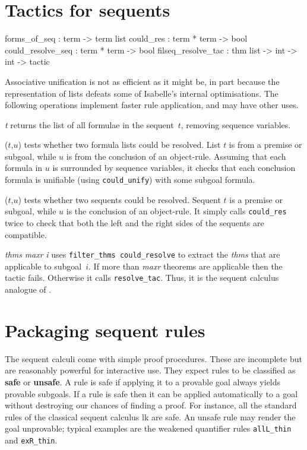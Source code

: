 \section{Tactics for sequents}
\begin{ttbox} 
forms_of_seq       : term -> term list
could_res          : term * term -> bool
could_resolve_seq  : term * term -> bool
filseq_resolve_tac : thm list -> int -> int -> tactic
\end{ttbox}
Associative unification is not as efficient as it might be, in part because
the representation of lists defeats some of Isabelle's internal
optimisations.  The following operations implement faster rule application,
and may have other uses.
\begin{ttdescription}
\item[\ttindexbold{forms_of_seq} {\it t}] 
returns the list of all formulae in the sequent~$t$, removing sequence
variables.

\item[\ttindexbold{could_res} ($t$,$u$)] 
tests whether two formula lists could be resolved.  List $t$ is from a
premise or subgoal, while $u$ is from the conclusion of an object-rule.
Assuming that each formula in $u$ is surrounded by sequence variables, it
checks that each conclusion formula is unifiable (using {\tt could_unify})
with some subgoal formula.

\item[\ttindexbold{could_resolve_seq} ($t$,$u$)] 
  tests whether two sequents could be resolved.  Sequent $t$ is a premise
  or subgoal, while $u$ is the conclusion of an object-rule.  It simply
  calls {\tt could_res} twice to check that both the left and the right
  sides of the sequents are compatible.

\item[\ttindexbold{filseq_resolve_tac} {\it thms} {\it maxr} {\it i}] 
uses {\tt filter_thms could_resolve} to extract the {\it thms} that are
applicable to subgoal~$i$.  If more than {\it maxr\/} theorems are
applicable then the tactic fails.  Otherwise it calls {\tt resolve_tac}.
Thus, it is the sequent calculus analogue of .
\end{ttdescription}


\section{Packaging sequent rules}

The sequent calculi come with simple proof procedures.  These are incomplete
but are reasonably powerful for interactive use.  They expect rules to be
classified as {\bf safe} or {\bf unsafe}.  A rule is safe if applying it to a
provable goal always yields provable subgoals.  If a rule is safe then it can
be applied automatically to a goal without destroying our chances of finding a
proof.  For instance, all the standard rules of the classical sequent calculus
{\sc lk} are safe.  An unsafe rule may render the goal unprovable; typical
examples are the weakened quantifier rules {\tt allL_thin} and {\tt exR_thin}.

